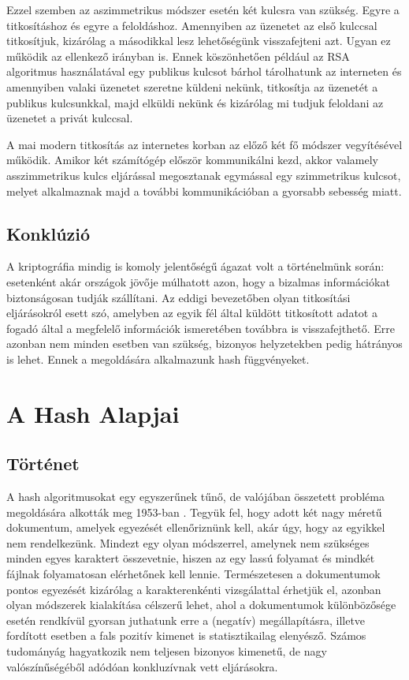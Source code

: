 Ezzel szemben az aszimmetrikus módszer esetén két kulcsra van szükség. Egyre a titkosításhoz és egyre a feloldáshoz. Amennyiben az üzenetet az első kulccsal titkosítjuk, kizárólag a másodikkal lesz lehetőségünk visszafejteni azt. Ugyan ez működik az ellenkező irányban is. Ennek köszönhetően például az RSA algoritmus használatával egy publikus kulcsot bárhol tárolhatunk az interneten és amennyiben valaki üzenetet szeretne küldeni nekünk, titkosítja az üzenetét a publikus kulcsunkkal, majd elküldi nekünk és kizárólag mi tudjuk feloldani az üzenetet a privát kulccsal.

A mai modern titkosítás az internetes korban az előző két fő módszer vegyítésével működik. Amikor két számítógép először kommunikálni kezd, akkor valamely asszimmetrikus kulcs eljárással megosztanak egymással egy szimmetrikus kulcsot, melyet alkalmaznak majd a további kommunikációban a gyorsabb sebesség miatt.

\subsection{Konklúzió}

A kriptográfia mindig is komoly jelentőségű ágazat volt a történelmünk során: esetenként akár országok jövője múlhatott azon, hogy a bizalmas információkat biztonságosan tudják szállítani.
Az eddigi bevezetőben olyan titkosítási eljárásokról esett szó, amelyben az egyik fél által küldött titkosított adatot a fogadó által a megfelelő információk ismeretében továbbra is visszafejthető.
Erre azonban nem minden esetben van szükség, bizonyos helyzetekben pedig hátrányos is lehet. Ennek a megoldására alkalmazunk hash függvényeket.

\section{A Hash Alapjai}



\subsection{Történet}

A hash algoritmusokat egy egyszerűnek tűnő, de valójában összetett probléma megoldására alkották meg 1953-ban \cite{dang2015secure}. Tegyük fel, hogy adott két nagy méretű dokumentum, amelyek egyezését ellenőriznünk kell, akár úgy, hogy az egyikkel nem rendelkezünk. Mindezt egy olyan módszerrel, amelynek nem szükséges minden egyes karaktert összevetnie, hiszen az egy lassú folyamat és mindkét fájlnak folyamatosan elérhetőnek kell lennie.
Természetesen a dokumentumok pontos egyezését kizárólag a karakterenkénti vizsgálattal érhetjük el, azonban olyan módszerek kialakítása célszerű lehet, ahol a dokumentumok különbözősége esetén rendkívül gyorsan juthatunk erre a (negatív) megállapításra, illetve fordított esetben a fals pozitív kimenet is statisztikailag elenyésző.
Számos tudományág hagyatkozik nem teljesen bizonyos kimenetű, de nagy valószínűségéből adódóan konkluzívnak vett eljárásokra.

